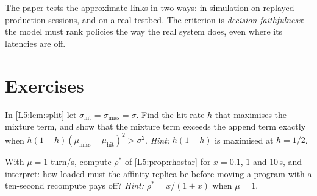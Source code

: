 The paper tests the approximate links in two ways: in simulation on
replayed production sessions, and on a real testbed. The criterion is
\emph{decision faithfulness}: the model must rank policies the way the
real system does, even where its latencies are off.

\section{Exercises}

\begin{exercise}\label{L5:ex:split}
In \cref{L5:lem:split} let $\sigma_{\mathrm{hit}}=\sigma_{\mathrm{miss}}=\sigma$.
Find the hit rate $h$ that maximises the mixture term, and show that the
mixture term exceeds the append term exactly when
$h(1-h)(\mu_{\mathrm{miss}}-\mu_{\mathrm{hit}})^2>\sigma^2$.
\emph{Hint:} $h(1-h)$ is maximised at $h=1/2$.
\end{exercise}

\begin{exercise}\label{L5:ex:rhostar}
With $\mu=1$ turn/s, compute $\rho^*$ of \cref{L5:prop:rhostar} for
$x=0.1$, $1$ and $10$\,s, and interpret: how loaded must the affinity
replica be before moving a program with a ten-second recompute pays off?
\emph{Hint:} $\rho^*=x/(1+x)$ when $\mu=1$.
\end{exercise}
